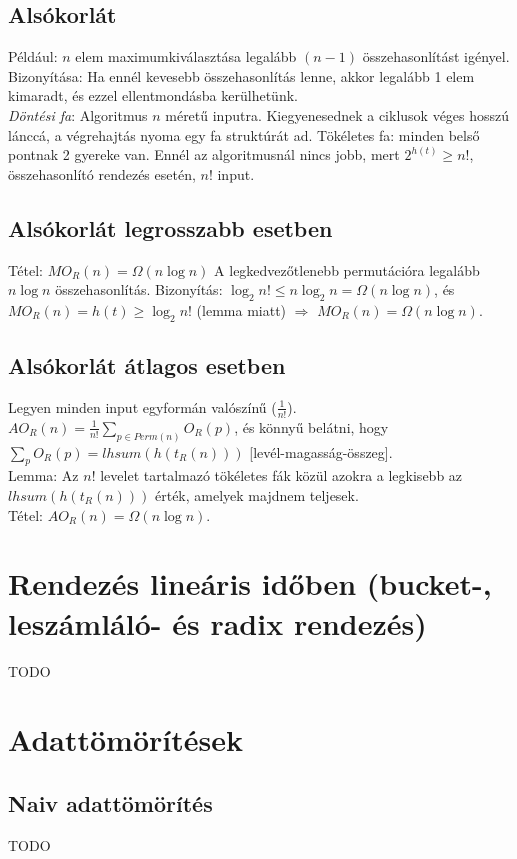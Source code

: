 \documentclass[margin=0px]{article}
\begin{document}
\subsection{Alsókorlát}

Például: $n$ elem maximumkiválasztása legalább $(n-1)$ összehasonlítást igényel. Bizonyítása: Ha ennél kevesebb összehasonlítás lenne, akkor legalább 1 elem kimaradt, és ezzel ellentmondásba kerülhetünk. \\
\textit{Döntési fa}: Algoritmus $n$ méretű inputra. Kiegyenesednek a ciklusok véges hosszú lánccá, a végrehajtás nyoma egy fa struktúrát ad. Tökéletes fa: minden belső pontnak 2 gyereke van. Ennél az algoritmusnál nincs jobb, mert $2^{h(t)} \geq n!$, összehasonlító rendezés esetén, $n!$ input.

\subsection{Alsókorlát legrosszabb esetben}

Tétel: $MO_R(n) = \Omega(n\log{n})$ A legkedvezőtlenebb permutációra legalább $n\log{n}$ összehasonlítás. Bizonyítás: $\log_2{n!} \leq n\log_2{n} = \Omega(n\log{n})$, és $MO_R(n)=h(t) \geq \log_2{n!}$ (lemma miatt) $\Rightarrow$ $MO_R(n)=\Omega(n\log{n})$.

\subsection{Alsókorlát átlagos esetben}

Legyen minden input egyformán valószínű ($\frac{1}{n!}$). \\
$AO_R(n) = \frac{1}{n!}\sum_{p \in Perm(n)}{O_R(p)}$, és könnyű belátni, hogy $\sum_{p}{O_R(p)} = lhsum(h(t_R(n)))$ [levél-magasság-összeg]. \\
Lemma: Az $n!$ levelet tartalmazó tökéletes fák közül azokra a legkisebb az $lhsum(h(t_R(n)))$ érték, amelyek majdnem teljesek. \\
Tétel: $AO_R(n) = \Omega(n\log{n})$.

\section{Rendezés lineáris időben (bucket-, leszámláló- és radix rendezés)}
TODO

\section{Adattömörítések}
\subsection{Naiv adattömörítés}
TODO
\end{document}
